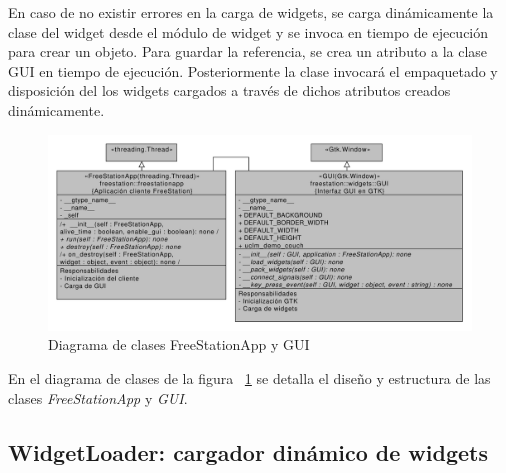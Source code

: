 En caso de no existir errores en la carga de widgets, se carga dinámicamente la
clase del widget desde el módulo de widget y se invoca en tiempo de ejecución
para crear un objeto. Para guardar la referencia, se crea un atributo a la clase
GUI en tiempo de ejecución. Posteriormente la clase invocará el empaquetado y
disposición del los widgets cargados a través de dichos atributos creados 
dinámicamente.

\begin{figure}[ht]
    \begin{center}
        \includegraphics[width=425px]{src/img/diagrams/freestation-class-diagram-freestationapp.pdf}
        \caption[Diagrama de clases FreeStationApp y GUI]
          {Diagrama de clases FreeStationApp y GUI}
        \label{fig:classgui}
    \end{center}
\end{figure}

En el diagrama de clases de la figura ~\ref{fig:classgui} se detalla el diseño y
estructura de las clases \emph{FreeStationApp} y \emph{GUI}.

\newpage

\subsection{WidgetLoader: cargador dinámico de widgets}

